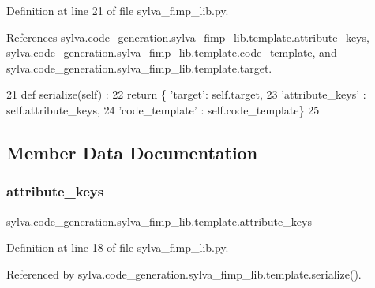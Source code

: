 Definition at line 21 of file sylva\+\_\+fimp\+\_\+lib.\+py.



References sylva.\+code\+\_\+generation.\+sylva\+\_\+fimp\+\_\+lib.\+template.\+attribute\+\_\+keys, sylva.\+code\+\_\+generation.\+sylva\+\_\+fimp\+\_\+lib.\+template.\+code\+\_\+template, and sylva.\+code\+\_\+generation.\+sylva\+\_\+fimp\+\_\+lib.\+template.\+target.


\begin{DoxyCode}
21   \textcolor{keyword}{def }serialize(self) :
22     \textcolor{keywordflow}{return} \{ \textcolor{stringliteral}{'target'}: self.target,
23              \textcolor{stringliteral}{'attribute\_keys'} : self.attribute\_keys,
24              \textcolor{stringliteral}{'code\_template'} : self.code\_template\}
25 
\end{DoxyCode}


\subsection{Member Data Documentation}
\mbox{\label{classsylva_1_1code__generation_1_1sylva__fimp__lib_1_1template_a1758881052bbbaecc550bf8796813ea0}} 
\subsubsection{\texorpdfstring{attribute\+\_\+keys}{attribute\_keys}}
{\footnotesize\ttfamily sylva.\+code\+\_\+generation.\+sylva\+\_\+fimp\+\_\+lib.\+template.\+attribute\+\_\+keys}



Definition at line 18 of file sylva\+\_\+fimp\+\_\+lib.\+py.



Referenced by sylva.\+code\+\_\+generation.\+sylva\+\_\+fimp\+\_\+lib.\+template.\+serialize().

\mbox{\label{classsylva_1_1code__generation_1_1sylva__fimp__lib_1_1template_a3eb675d502d5f289d057ae53326b69e0}} 

